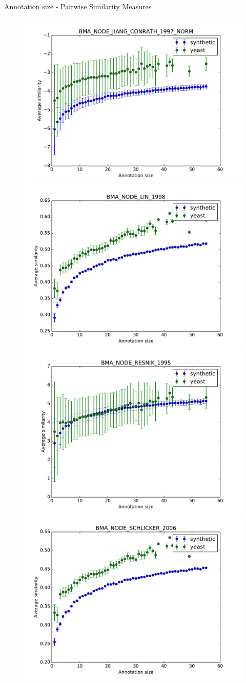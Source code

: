 \documentclass{beamer}
\begin{document}
\begin{frame}{Annotation size - Pairwise Similarity Measures}

\begin{figure}

\includegraphics[width=0.5\linewidth, height=0.4\textheight]{pairwise/SIM_GROUPWISE_BMA_SIM_PAIRWISE_DAG_NODE_JIANG_CONRATH_1997_NORM_avg.pdf}
\includegraphics[width=0.5\linewidth, height=0.4\textheight]{pairwise/SIM_GROUPWISE_BMA_SIM_PAIRWISE_DAG_NODE_LIN_1998_avg.pdf}\\
\includegraphics[width=0.5\linewidth, height=0.4\textheight]{pairwise/SIM_GROUPWISE_BMA_SIM_PAIRWISE_DAG_NODE_RESNIK_1995_avg.pdf}
\includegraphics[width=0.5\linewidth, height=0.4\textheight]{pairwise/SIM_GROUPWISE_BMA_SIM_PAIRWISE_DAG_NODE_SCHLICKER_2006_avg.pdf}
\end{figure}

\end{frame}
\end{document}
